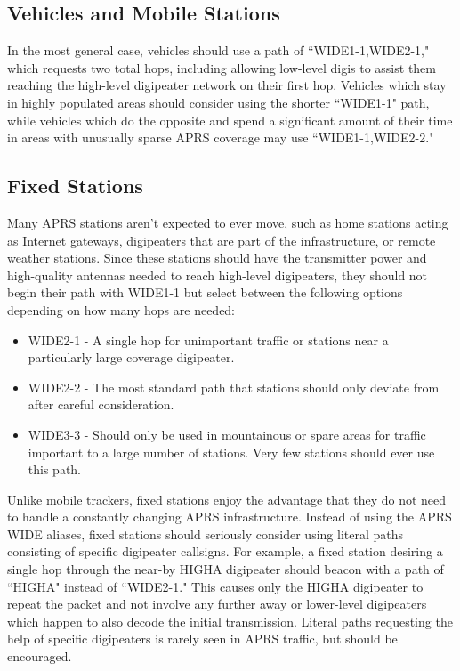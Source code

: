 \subsection{Vehicles and Mobile Stations}

In the most general case, vehicles should use a path of ``WIDE1-1,WIDE2-1,"
which requests two total hops, including allowing low-level digis to assist
them reaching the high-level digipeater network on their first hop.
Vehicles which stay in highly populated areas should consider using the
shorter ``WIDE1-1" path, while vehicles which do the opposite and spend
a significant amount
of their time in areas with unusually sparse APRS coverage 
may use ``WIDE1-1,WIDE2-2." \cite{infoaprspath}

\subsection{Fixed Stations}

Many APRS stations aren't expected to ever move, such as home stations acting
as Internet gateways, digipeaters that are part of the infrastructure, or
remote weather stations.
Since these stations should have the transmitter power and high-quality antennas
needed to reach high-level digipeaters,
they should not begin their path with WIDE1-1 but select between the following
options depending on how many hops are needed:
\begin{itemize}
	\item WIDE2-1 - A single hop for unimportant traffic or stations near a
		particularly large coverage digipeater.
	\item WIDE2-2 - The most standard path that stations should only
		deviate from after careful consideration.
	\item WIDE3-3 - Should only be used in mountainous or spare areas for
		traffic important to a large number of stations. Very few
		stations should ever use this path.
\end{itemize}

Unlike mobile trackers,
fixed stations enjoy the advantage that they do not need to handle a
constantly changing APRS infrastructure.
Instead of using the APRS WIDE aliases, fixed stations should seriously
consider using literal paths consisting of specific digipeater callsigns.
For example, a fixed station desiring a single hop through the near-by
HIGHA digipeater should beacon with a path of ``HIGHA" instead of ``WIDE2-1."
This causes only the HIGHA digipeater to repeat the packet and not involve
any further away or lower-level digipeaters which happen to also decode the
initial transmission. 
Literal paths requesting the help of specific digipeaters is rarely
seen in APRS traffic, but should be encouraged.

